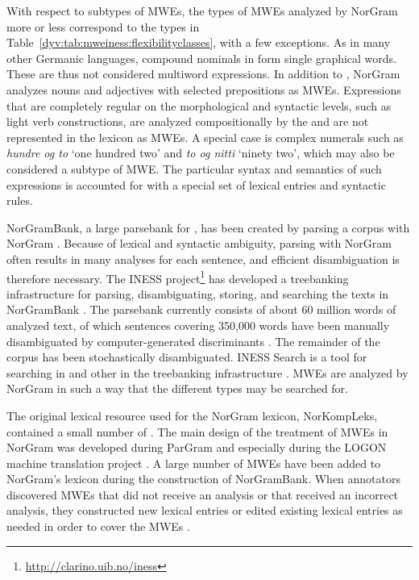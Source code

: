 \documentclass[output=paper]{langsci/langscibook}
\begin{document}
With respect to subtypes of MWEs, the types of MWEs analyzed by NorGram more or less correspond to the types in Table~\ref{dyv:tab:mweiness:flexibilityclasses}, with a few exceptions. 
As in many other Germanic languages, compound nominals in  form single graphical words. 
These are thus not considered multiword expressions.
In addition to , NorGram analyzes nouns and adjectives with selected prepositions as MWEs.
Expressions that are completely regular on the morphological and syntactic levels, such as light verb constructions, are analyzed compositionally by the  and are not represented in the lexicon as MWEs.
A special case is complex numerals such as \emph{hundre og to} `one hundred two' and  \emph{to og nitti} `ninety two', which may also be considered a subtype of MWE.
The particular syntax and semantics of such expressions is accounted for with a special set of lexical entries and syntactic rules.

NorGramBank, a large parsebank for , has been created by parsing a corpus with NorGram \citep{dyvik16}.
Because of lexical and syntactic ambiguity, parsing with NorGram often results in many analyses for each sentence, and efficient disambiguation is therefore necessary.
The INESS project\footnote{\url{http://clarino.uib.no/iness}} has developed a treebanking infrastructure for parsing, disambiguating, storing, and searching the texts in NorGramBank \citep{rosen12lrec}.
The parsebank currently consists of about 60 million words of analyzed text, of which sentences covering 350,000 words have been manually disambiguated by computer-generated discriminants \citep{rosen07lfg}.
The remainder of the corpus has been stochastically disambiguated.
INESS Search is a tool for searching in  and other  in the treebanking infrastructure \citep{meurer12}.
MWEs are analyzed by NorGram in such a way that the different types may be searched for.

The original lexical resource used for the NorGram lexicon, NorKompLeks, contained a small number of  \citep{nordgard00}.
The main design of the treatment of MWEs in NorGram was developed during ParGram \citep{pargram02} and especially during the LOGON machine translation project \citep{lonning04}.
A large number of MWEs have been added to NorGram’s lexicon during the construction of NorGramBank.
When annotators discovered MWEs that did not receive an analysis or that received an incorrect analysis, they constructed new lexical entries or edited existing lexical entries as needed in order to cover the MWEs \citep{losnegaard12,rosen16lre}.
\end{document}
